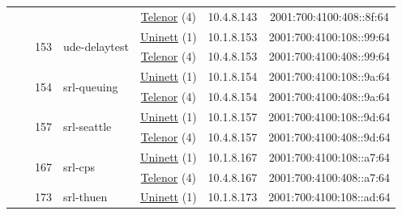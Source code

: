 \begin{small}
\begin{center}
\begin{longtable}{|c|c|c|c|c|c|c|c|}
  &  &  &  & \multicolumn{2}{|c|}{\tiny{\href{https://www.telenor.no}{Telenor} (4)}} & \tiny{10.4.8.143} & \tiny{2001:700:4100:408::8f:64} \\* \cline{3-3}\cline{4-4}\cline{5-5}\cline{6-6}\cline{7-7}\cline{8-8}
  &  & \multirow{2}{*}{\tiny{153}} & \multicolumn{1}{|l|}{\multirow{2}{*}{\tiny{ude-delaytest}}} & \multicolumn{2}{|c|}{\tiny{\href{https://www.uninett.no}{Uninett} (1)}} & \tiny{10.1.8.153} & \tiny{2001:700:4100:108::99:64} \\* \cline{5-5}\cline{6-6}\cline{7-7}\cline{8-8}
  &  &  &  & \multicolumn{2}{|c|}{\tiny{\href{https://www.telenor.no}{Telenor} (4)}} & \tiny{10.4.8.153} & \tiny{2001:700:4100:408::99:64} \\* \cline{3-3}\cline{4-4}\cline{5-5}\cline{6-6}\cline{7-7}\cline{8-8}
  &  & \multirow{2}{*}{\tiny{154}} & \multicolumn{1}{|l|}{\multirow{2}{*}{\tiny{srl-queuing}}} & \multicolumn{2}{|c|}{\tiny{\href{https://www.uninett.no}{Uninett} (1)}} & \tiny{10.1.8.154} & \tiny{2001:700:4100:108::9a:64} \\* \cline{5-5}\cline{6-6}\cline{7-7}\cline{8-8}
  &  &  &  & \multicolumn{2}{|c|}{\tiny{\href{https://www.telenor.no}{Telenor} (4)}} & \tiny{10.4.8.154} & \tiny{2001:700:4100:408::9a:64} \\* \cline{3-3}\cline{4-4}\cline{5-5}\cline{6-6}\cline{7-7}\cline{8-8}
  &  & \multirow{2}{*}{\tiny{157}} & \multicolumn{1}{|l|}{\multirow{2}{*}{\tiny{srl-seattle}}} & \multicolumn{2}{|c|}{\tiny{\href{https://www.uninett.no}{Uninett} (1)}} & \tiny{10.1.8.157} & \tiny{2001:700:4100:108::9d:64} \\* \cline{5-5}\cline{6-6}\cline{7-7}\cline{8-8}
  &  &  &  & \multicolumn{2}{|c|}{\tiny{\href{https://www.telenor.no}{Telenor} (4)}} & \tiny{10.4.8.157} & \tiny{2001:700:4100:408::9d:64} \\* \cline{3-3}\cline{4-4}\cline{5-5}\cline{6-6}\cline{7-7}\cline{8-8}
  &  & \multirow{2}{*}{\tiny{167}} & \multicolumn{1}{|l|}{\multirow{2}{*}{\tiny{srl-cps}}} & \multicolumn{2}{|c|}{\tiny{\href{https://www.uninett.no}{Uninett} (1)}} & \tiny{10.1.8.167} & \tiny{2001:700:4100:108::a7:64} \\* \cline{5-5}\cline{6-6}\cline{7-7}\cline{8-8}
  &  &  &  & \multicolumn{2}{|c|}{\tiny{\href{https://www.telenor.no}{Telenor} (4)}} & \tiny{10.4.8.167} & \tiny{2001:700:4100:408::a7:64} \\* \cline{3-3}\cline{4-4}\cline{5-5}\cline{6-6}\cline{7-7}\cline{8-8}
  &  & \multirow{2}{*}{\tiny{173}} & \multicolumn{1}{|l|}{\multirow{2}{*}{\tiny{srl-thuen}}} & \multicolumn{2}{|c|}{\tiny{\href{https://www.uninett.no}{Uninett} (1)}} & \tiny{10.1.8.173} & \tiny{2001:700:4100:108::ad:64} \\* \cline{5-5}\cline{6-6}\cline{7-7}\cline{8-8}

\end{longtable}
\end{center}
\end{small}
